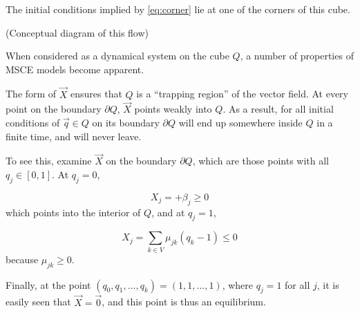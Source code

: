 \documentclass{article}
\begin{document}
The initial conditions implied by \eqref{eq:corner} lie at one of the corners of
this cube.

(Conceptual diagram of this flow)

When considered as a dynamical system on the cube $Q$, a number of properties
of MSCE models become apparent.

The form of $\vec{X}$ ensures that $Q$ is a ``trapping region'' of the
vector field. At every point on the boundary $\partial Q$, $\vec{X}$ points weakly
into $Q$. As a result, for all initial conditions of $\vec{q} \in Q$ on its
boundary $\partial Q$ will end up somewhere inside $Q$ in a finite time, and will never leave.

To see this, examine $\vec{X}$ on the boundary $\partial Q$, which are those
points with all $q_j \in [0, 1]$. At $q_j = 0$,

\begin{equation*}
    X_j = +\beta_j \geq 0
\end{equation*}
which points into the interior of $Q$, and at $q_j = 1$,

\begin{equation*}
    X_j = \sum_{k \in V} \mu_{jk} (q_k - 1) \leq 0
\end{equation*}
because $\mu_{jk} \geq 0$.

Finally, at the point $(q_0, q_1, \dots, q_k) = (1,1,\dots,1)$, where $q_j=1$
for all $j$, it is easily seen that $\vec{X} = \vec{0}$, and this point is thus
an equilibrium.
\end{document}
